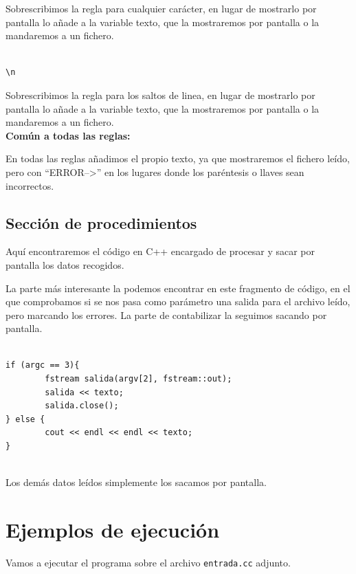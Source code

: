 \documentclass[12pt, spanish]{article}
\begin{document}
Sobrescribimos la regla para cualquier carácter, en lugar de mostrarlo por pantalla lo añade a la variable texto, que la mostraremos por pantalla o la mandaremos a un fichero.


\begin{verbatim}

\n

\end{verbatim}

Sobrescribimos la regla para los saltos de linea, en lugar de mostrarlo por pantalla lo añade a la variable texto, que la mostraremos por pantalla o la mandaremos a un fichero.\\


\textbf{Común a todas las reglas:}

En todas las reglas añadimos el propio texto, ya que mostraremos el fichero leído, pero con  ``ERROR-->'' en los lugares donde los paréntesis o llaves sean incorrectos.

\subsection{Sección de procedimientos}

Aquí encontraremos el código en C++ encargado de procesar y sacar por pantalla los datos recogidos.

La parte más interesante la podemos encontrar en este fragmento de código, en el que comprobamos si se nos pasa como parámetro una salida para el archivo leído, pero marcando los errores. La parte de contabilizar la seguimos sacando por pantalla.

\begin{verbatim}

if (argc == 3){
		fstream salida(argv[2], fstream::out);
		salida << texto;
		salida.close();
} else {
		cout << endl << endl << texto;
}


\end{verbatim}

Los demás datos leídos simplemente los sacamos por pantalla.


\newpage
\section{Ejemplos de ejecución}

Vamos a ejecutar el programa sobre el archivo \texttt{entrada.cc} adjunto.
\end{document}

